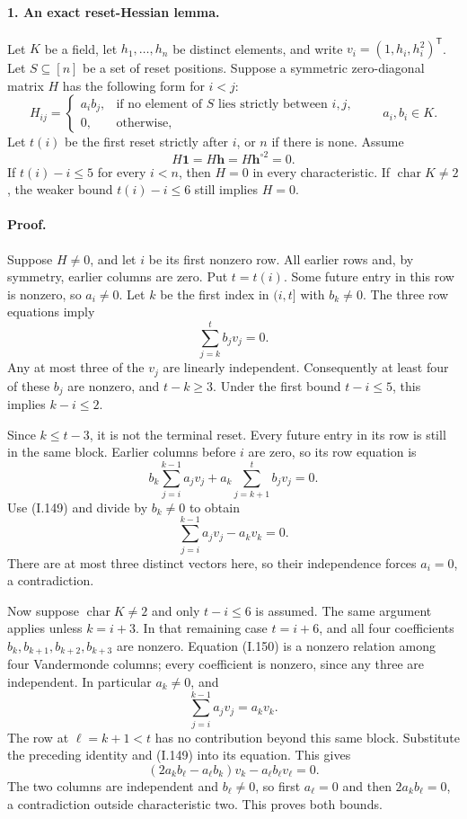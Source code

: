 \paragraph{1. An exact reset-Hessian lemma.}
Let $K$ be a field, let $h_1,\ldots,h_n$ be distinct elements,
and write $v_i=(1,h_i,h_i^2)^{\mathsf T}$. Let $S\subseteq[n]$
be a set of reset positions. Suppose a symmetric zero-diagonal
matrix $H$ has the following form for $i<j$:
\[
 H_{ij}=\begin{cases}
 a_i b_j,&\text{if no element of $S$ lies strictly between $i,j$},\\
 0,&\text{otherwise},
 \end{cases}
 \qquad a_i,b_i\in K.
 \tag{I.147}
\]
Let $t(i)$ be the first reset strictly after $i$, or $n$ if
there is none. Assume
\[
 H\mathbf1=H\mathbf h=H\mathbf h^{\circ2}=0.
 \tag{I.148}
\]
If $t(i)-i\le5$ for every $i<n$, then $H=0$ in every
characteristic. If $\operatorname{char}K\ne2$, the weaker
bound $t(i)-i\le6$ still implies $H=0$.

\paragraph{Proof.}
Suppose $H\ne0$, and let $i$ be its first nonzero row.
All earlier rows and, by symmetry, earlier columns are zero.
Put $t=t(i)$. Some future entry in this row is nonzero,
so $a_i\ne0$. Let $k$ be the first index in $(i,t]$ with
$b_k\ne0$. The three row equations imply
\[
 \sum_{j=k}^t b_jv_j=0.
 \tag{I.149}
\]
Any at most three of the $v_j$ are linearly independent.
Consequently at least four of these $b_j$ are nonzero, and
$t-k\ge3$. Under the first bound $t-i\le5$, this implies
$k-i\le2$.

Since $k\le t-3$, it is not the terminal reset. Every future
entry in its row is still in the same block. Earlier columns
before $i$ are zero, so its row equation is
\[
 b_k\sum_{j=i}^{k-1}a_jv_j+
 a_k\sum_{j=k+1}^t b_jv_j=0.
\]
Use (I.149) and divide by $b_k\ne0$ to obtain
\[
 \sum_{j=i}^{k-1}a_jv_j-a_kv_k=0.
 \tag{I.150}
\]
There are at most three distinct vectors here, so their
independence forces $a_i=0$, a contradiction.

Now suppose $\operatorname{char}K\ne2$ and only $t-i\le6$
is assumed. The same argument applies unless $k=i+3$.
In that remaining case $t=i+6$, and all four coefficients
$b_k,b_{k+1},b_{k+2},b_{k+3}$ are nonzero. Equation (I.150)
is a nonzero relation among four Vandermonde columns; every
coefficient is nonzero, since any three are independent.
In particular $a_k\ne0$, and
\[
 \sum_{j=i}^{k-1}a_jv_j=a_kv_k.
\]
The row at $\ell=k+1<t$ has no contribution beyond this same
block. Substitute the preceding identity and (I.149) into its
equation. This gives
\[
 (2a_kb_\ell-a_\ell b_k)v_k-a_\ell b_\ell v_\ell=0.
 \tag{I.151}
\]
The two columns are independent and $b_\ell\ne0$, so first
$a_\ell=0$ and then $2a_kb_\ell=0$, a contradiction outside
characteristic two. This proves both bounds.

